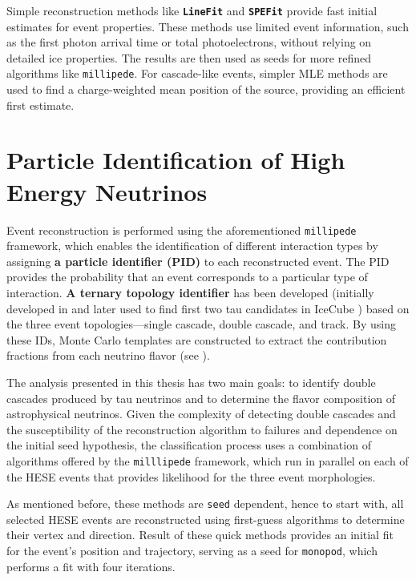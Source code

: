 Simple reconstruction methods like \textbf{\texttt{LineFit}} and \textbf{\texttt{SPEFit}} provide fast initial estimates for event properties. These methods use limited event information, such as the first photon arrival time or total photoelectrons, without relying on detailed ice properties. The results are then used as seeds for more refined algorithms like \texttt{millipede}. For cascade-like events, simpler MLE methods are used to find a charge-weighted mean position of the source, providing an efficient first estimate.


\section{Particle Identification of High Energy Neutrinos}
\label{sec:PID}
Event reconstruction is performed using the aforementioned \texttt{millipede} framework, which enables the identification of different interaction types by assigning \textbf{a particle identifier (PID)} to each reconstructed event. The PID provides the probability that an event corresponds to a particular type of interaction. \textbf{A ternary topology identifier} has been developed (initially developed in \cite{marcel_thesis} and later used to find first two tau candidates in IceCube ) based on the three event topologies—single cascade, double cascade, and track. By using these IDs, Monte Carlo templates are constructed to extract the contribution fractions from each neutrino flavor (see ).

The analysis presented in this thesis has two main goals: to identify double cascades produced by tau neutrinos and to determine the flavor composition of astrophysical neutrinos. Given the complexity of detecting double cascades and the susceptibility of the reconstruction algorithm to failures and dependence on the initial seed hypothesis, the classification process uses a combination of algorithms offered by the \texttt{milllipede} framework, which run in parallel on each of the HESE events that provides likelihood for the three event morphologies. 

As mentioned before, these methods are \texttt{seed} dependent, hence to start with, all selected HESE events are reconstructed using first-guess algorithms to determine their vertex and direction. Result of these quick methods provides an initial fit for the event's position and trajectory, serving as a seed for \texttt{monopod}, which performs a fit with four iterations.

